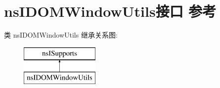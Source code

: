 \hypertarget{interfacens_i_d_o_m_window_utils}{}\section{ns\+I\+D\+O\+M\+Window\+Utils接口 参考}
\label{interfacens_i_d_o_m_window_utils}
类 ns\+I\+D\+O\+M\+Window\+Utils 继承关系图\+:\begin{figure}[H]
\begin{center}
\leavevmode
\includegraphics[height=2.000000cm]{interfacens_i_d_o_m_window_utils}
\end{center}
\end{figure}
